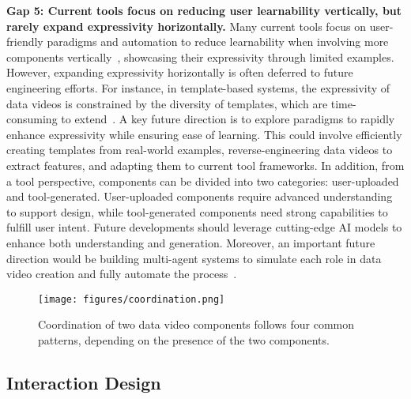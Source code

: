 \textbf{Gap 5: Current tools focus on reducing user learnability vertically, but rarely expand expressivity horizontally.}
Many current tools focus on user-friendly paradigms and automation to reduce learnability when involving more components vertically~\cite{Grossman2009}, showcasing their expressivity through limited examples. However, expanding expressivity horizontally is often deferred to future engineering efforts. 
For instance, in template-based systems, the expressivity of data videos is constrained by the diversity of templates, which are time-consuming to extend~\cite{wonderflow, Amini2017}. 
A key future direction is to explore paradigms to rapidly enhance expressivity while ensuring ease of learning. This could involve efficiently creating templates from real-world examples, reverse-engineering data videos to extract features, and adapting them to current tool frameworks.
In addition, from a tool perspective, components can be divided into two categories: user-uploaded and tool-generated. 
User-uploaded components require advanced understanding to support design, while tool-generated components need strong capabilities to fulfill user intent. Future developments should leverage cutting-edge AI models to enhance both understanding and generation.
Moreover, an important future direction would be building multi-agent systems to simulate each role in data video creation and fully automate the process~\cite{Shen2024a}.

\begin{figure*}[t]
  \centering
    \texttt{[image: figures/coordination.png]}
    \caption{Coordination of two data video components follows four common patterns, depending on the presence of the two components.}
\label{fig:Coordination}
  \vspace{-10px}
\end{figure*}


\subsection{Interaction Design}


